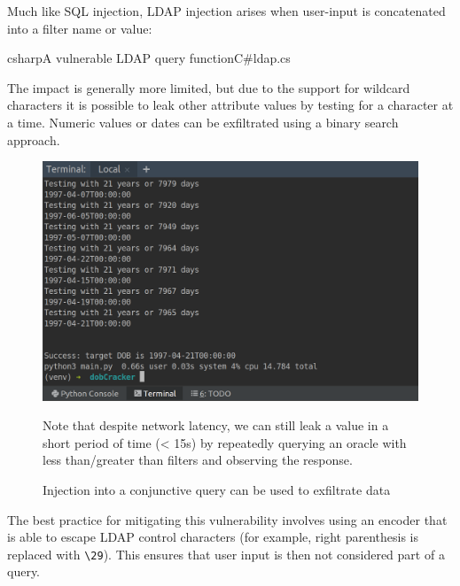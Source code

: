 \documentclass[a4paper,openany,12pt]{book}
\begin{document}
Much like SQL injection, LDAP injection arises when user-input is concatenated into a filter name or value:

\newsavebox\myva
\begin{lrbox}{\myva}\begin{minipage}{\textwidth}
    \begin{mycodefile}{csharp}{\label{code:motivating:ldap:1}A vulnerable LDAP query function}{C\#}{ldap.cs}\end{mycodefile}
\end{minipage}\end{lrbox}



The impact is generally more limited, but due to the support for wildcard characters it is possible to leak other
attribute values by testing for a character at a time.
Numeric values or dates can be exfiltrated using a binary search approach.

\begin{figure}[H]
    \begin{MyMdframed}
        \vspace{0.5em}


        \caption{Injection into a conjunctive query can be used to exfiltrate data}
        \vspace{0.5em}
        \captionsetup{style=default}

        \begin{center}\includegraphics[width=0.5\linewidth]{dobcrack.png}\end{center}

        \vspace{0.5em}

        Note that despite network latency, we can still leak a value in a short period of time (< 15s) by
        repeatedly querying an oracle with less than/greater than filters and observing the response.
    \end{MyMdframed}
\end{figure}

The best practice for mitigating this vulnerability involves using an encoder that is able to escape LDAP control
characters (for example, right parenthesis is replaced with \texttt{\textbackslash 29}).
This ensures that user input is then not considered part of a query.
\end{document}
